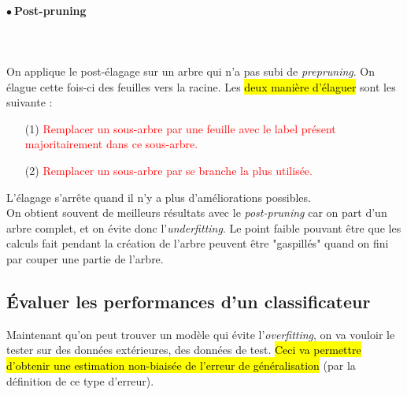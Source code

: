 \documentclass[letterpaper, 12pt]{article}
\newcommand{\alinea}{
\hspace*{0.5cm}}
\newcommand{\red}[1]{
	\textcolor{red}{#1}}
\newcommand{\point}{$\bullet\ $}
\begin{document}
			\paragraph{\point Post-pruning}~\\~\\
			\alinea On applique le post-élagage sur un arbre qui
				n'a pas subi de \textit{prepruning}. On élague cette fois-ci
				des feuilles vers la racine. Les \hl{deux manière 
				d'élaguer} sont les suivante :
				\begin{enumerate}
					\setlength{\itemsep}{0pt}
					\setlength{\parskip}{0pt}
					\setlength{\parsep}{0pt}
					\item[(1)] \red{Remplacer un sous-arbre par une feuille
						avec le label présent majoritairement dans ce
						sous-arbre.}
					\item[(2)] \red{Remplacer un sous-arbre par se branche 
						la plus utilisée.}
				\end{enumerate}
				L'élagage s'arrête quand il n'y a plus d'améliorations
				possibles.\\
			\alinea On obtient souvent de meilleurs résultats avec le 
				\textit{post-pruning} car on part d'un arbre complet,
				et on évite donc l'\textit{underfitting}. Le point faible 
				pouvant être que les calculs fait pendant la création
				de l'arbre peuvent être "gaspillés" quand on fini par 
				couper une partie de l'arbre.
		\subsection{\'Evaluer les performances d'un classificateur}
			\alinea Maintenant qu'on peut trouver un modèle qui évite
				l'\textit{overfitting}, on va vouloir le tester sur des
				données extérieures, des données de test. \hl{Ceci va 
				permettre d'obtenir une estimation non-biaisée de l'erreur 
				de généralisation} (par la définition de ce type d'erreur).
\end{document}
